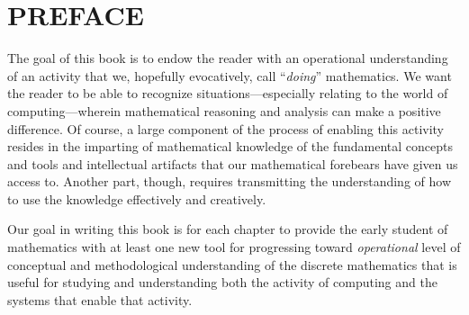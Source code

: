 
\chapter*{PREFACE}

The goal of this book is to endow the reader with an operational
understanding of an activity that we, hopefully evocatively, call
``{\em doing}'' mathematics.  We want the reader to be able to
recognize situations---especially relating to the world of
computing---wherein mathematical reasoning and analysis can make a
positive difference.  Of course, a large component of the process of
enabling this activity resides in the imparting of mathematical
knowledge of the fundamental concepts and tools and intellectual
artifacts that our mathematical forebears have given us access to.
Another part, though, requires transmitting the understanding of how
to use the knowledge effectively and creatively.

Our goal in writing this book is for each chapter to provide the early
student of mathematics with at least one new tool for progressing
toward {\em operational} level of conceptual and methodological
understanding of the discrete mathematics that is useful for studying
and understanding both the activity of computing and the systems that
enable that activity.

